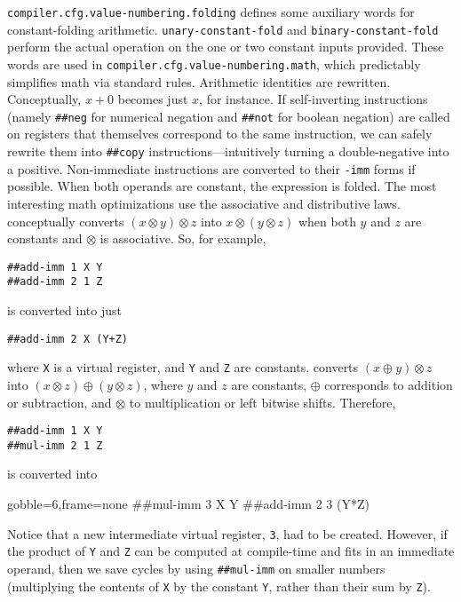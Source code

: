 \Verb|compiler.cfg.value-numbering.folding| defines some auxiliary words for
constant-folding arithmetic.  \Verb|unary-constant-fold| and
\Verb|binary-constant-fold| perform the actual operation on the one or two
constant inputs provided.  These words are used in
\Verb|compiler.cfg.value-numbering.math|, which predictably simplifies math via
standard rules.  Arithmetic identities are rewritten.  Conceptually, $x+0$
becomes just $x$, for instance.  If self-inverting instructions (namely
\Verb|##neg| for numerical negation and \Verb|##not| for boolean negation) are
called on registers that themselves correspond to the same instruction, we can
safely rewrite them into \Verb|##copy| instructions---intuitively turning a
double-negative into a positive.  Non-immediate instructions are converted to
their \Verb|-imm| forms if possible.  When both operands are constant, the
expression is folded.  The most interesting math optimizations use the
associative and distributive laws.   conceptually converts
$(x \otimes y) \otimes z$ into $x \otimes (y \otimes z)$ when both $y$ and $z$
are constants and $\otimes$ is associative.  So, for example,
%
\begin{center}
\Verb|##add-imm 1 X Y|\\
\Verb|##add-imm 2 1 Z|
\end{center}
%
\noindent is converted into just
%
\begin{center}
\Verb|##add-imm 2 X (Y+Z)|
\end{center}
%
\noindent where \Verb|X| is a virtual register, and \Verb|Y| and \Verb|Z|
are constants.   converts $(x \oplus y) \otimes z$ into $(x
\otimes z) \oplus (y \otimes z)$, where $y$ and $z$ are constants, $\oplus$
corresponds to addition or subtraction, and $\otimes$ to multiplication or left
bitwise shifts.  Therefore,
%
\begin{center}
\Verb|##add-imm 1 X Y|\\
\Verb|##mul-imm 2 1 Z|
\end{center}
%
\noindent is converted into
%
\begin{center}
  \begin{minipage}{0.2\linewidth}
    \begin{factorcode*}{gobble=6,frame=none}
      ##mul-imm 3 X Y
      ##add-imm 2 3 (Y*Z)
    \end{factorcode*}
  \end{minipage}
\end{center}
\noindent Notice that a new intermediate virtual register, \Verb|3|, had to be
created.  However, if the product of \Verb|Y| and \Verb|Z| can be computed at
compile-time and fits in an immediate operand, then we save cycles by using
\Verb|##mul-imm| on smaller numbers (multiplying the contents of \Verb|X| by
the constant \Verb|Y|, rather than their sum by \Verb|Z|).

